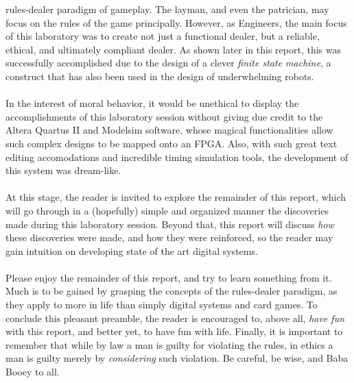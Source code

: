 \documentclass[12pt]{report}
\begin{document}
rules-dealer paradigm of gameplay. The layman, and even the patrician, may focus on the rules of the
game principally. However, as Engineers, the main focus of this laboratory was to create not just a
functional dealer, but a reliable, ethical, and ultimately compliant dealer. As shown later in this
report, this was successfully accomplished due to the design of a clever \textit{finite state
machine}, a construct that has also been used in the design of underwhelming robots.\\\\
In the interest of moral behavior, it would be unethical to display the accomplishments of this
laboratory session without giving due credit to the Altera Quartus II and Modelsim software, whose
magical functionalities allow such complex designs to be mapped onto an FPGA. Also, with such great
text editing accomodations and incredible timing simulation tools, the development of this system
was dream-like.\\\\
At this stage, the reader is invited to explore the remainder of this report, which will go through
in a (hopefully) simple and organized manner the discoveries made during this laboratory session.
Beyond that, this report will discuss \textit{how} these discoveries were made, and how they were
reinforced, so the reader may gain intuition on developing state of the art digital systems.\\\\
Please enjoy the remainder of this report, and try to learn something from it. Much is to be gained
by grasping the concepts of the rules-dealer paradigm, as they apply to more in life than simply
digital systems and card games. To conclude this pleasant preamble, the reader is encouraged to,
above all, \textit{have fun} with this report, and better yet, to have fun with life. Finally, it is
important to remember that while by law a man is guilty for violating the rules, in ethics a man is
guilty merely by \textit{considering} such violation. Be careful, be wise, and Baba Booey to all.
\end{document}
